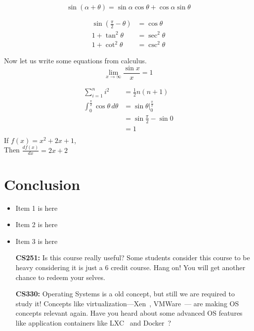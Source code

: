 \documentclass[a4paper, 10pt,twocolumn]{article}
\begin{document}
\begin{equation*}
\sin(\alpha + \theta) = \sin \alpha \cos \theta + \cos \alpha \sin \theta
\end{equation*}

\indent
\begin{align}
\sin(\frac{\pi}{2} -\theta) &= \cos\theta \\
1 + \tan^2 \theta &= \sec^2 \theta\\
1 + \cot^2 \theta &= \csc^2 \theta
\end{align}

Now let us write some equations from calculus.
\begin{equation*}
\lim_{x \to \infty} \frac{\sin x}{x} = 1
\end{equation*}

\begin{align*}
\sum_{i=1}^n i^2 &= \frac{1}{2} n (n+1) \\
\int_0^{\frac{\pi}{2}} \cos\theta\,d\theta &= \sin\theta\Big|_0^\frac{\pi}{2} \\
  &= \sin\frac{\pi}{2} - \sin 0 \\
  &= 1 \\
\end{align*}
If  $f(x) = x^2 + 2x + 1$, \\ 
Then  $\frac{df(x)}{dx} = 2x + 2$ 
\section{Conclusion}
\lipsum[30]
\begin{itemize}
\item Item 1 is here
\item Item 2 is here
\item Item 3 is here
\end{itemize}

\begin{itemize}
\item[{\bf CS251:}] Is this course really useful? Some students consider this course to
                    be heavy considering it is just a 6 credit course. Hang on! You will 
                    get another chance to redeem your selves.
\item[{\bf CS330:}] Operating Systems is a old concept, but still we are required to study it! 
                    Concepts like virtualization---Xen~\cite{xen}, VMWare~\cite{vmware}--- are
                    making OS concepts relevant again. Have you heard about some advanced OS features like 
                    application containers like LXC~\cite{lxc} and Docker~\cite{docker}?   
\end{itemize}
\end{document}
